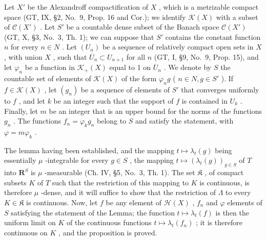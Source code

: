 Let \(X'\) be the Alexandroff compactification of \(X\) , which is a metrizable compact space (GT, IX, §2, No.~9, Prop. 16 and Cor.); we identify \(\mathcal{K}(X)\) with a subset of \(\mathcal{C}(X')\) . Let \(S'\) be a countable dense subset of the Banach space \(\mathcal{C}(X')\) (GT, X, §3, No.~3, Th. 1); we can suppose that \(S'\) contains the constant function \(n\) for every \(n \in N\) . Let \((U_n)\) be a sequence of relatively compact open sets in \(X\) , with union \(X\) , such that \(\overline{U}_n \subset U_{n+1}\) for all \(n\) (GT, I, §9, No.~9, Prop. 15), and let \(\varphi_n\) be a function in \(\mathcal{K}_+(X)\) equal to 1 on \(\overline{U}_n\) . We denote by \(S\) the countable set of elements of \(\mathcal{K}(X)\) of the form \(\varphi_n g\) ( \(n \in N, g \in S'\) ). If \(f \in \mathcal{K}(X)\) , let \((g_n)\) be a sequence of elements of \(S'\) that converges uniformly to \(f\) , and let \(k\) be an integer such that the support of \(f\) is contained in \(U_k\) . Finally, let \(m\) be an integer that is an upper bound for the norms of the functions \(g_n\) . The functions \(f_n = \varphi_k g_n\) belong to \(S\) and satisfy the statement, with \(\varphi = m\varphi_k\) .

The lemma having been established, and the mapping \(t \mapsto \lambda_t(g)\) being essentially \(\mu\) -integrable for every \(g \in S\) , the mapping \(t \mapsto (\lambda_t(g))_{g \in S}\) of \(T\) into \(\mathbf{R}^S\) is \(\mu\) -measurable (Ch. IV, §5, No.~3, Th. 1). The set \(\mathfrak{K}\) , of compact subsets \(K\) of \(T\) such that the restriction of this mapping to \(K\) is continuous, is therefore \(\mu\) -dense, and it will suffice to show that the restriction of \(\Lambda\) to every \(K \in \mathfrak{K}\) is continuous. Now, let \(f\) be any element of \(\mathcal{H}(X)\) , \(f_n\) and \(\varphi\) elements of \(S\) satisfying the statement of the Lemma; the function \(t \mapsto \lambda_t(f)\) is then the uniform limit on \(K\) of the continuous functions \(t \mapsto \lambda_t(f_n)\) ; it is therefore continuous on \(K\) , and the proposition is proved.
